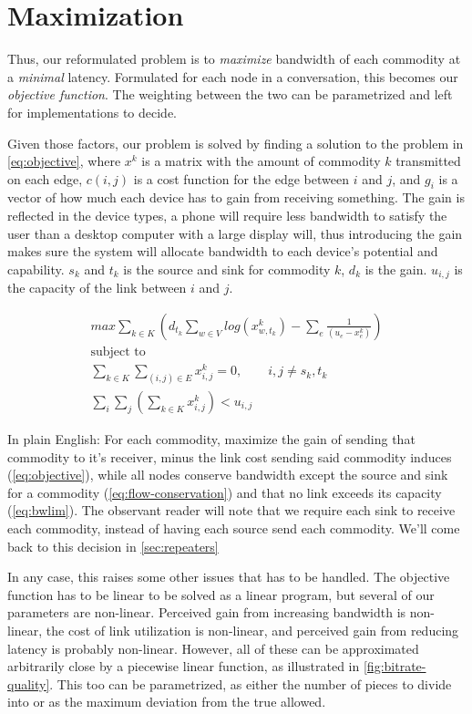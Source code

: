 \section{Maximization}

Thus, our reformulated problem is to \emph{maximize} bandwidth of each commodity at a \emph{minimal} latency. Formulated for each node in a conversation, this becomes our \emph{objective function}. The weighting between the two can be parametrized and left for implementations to decide.

Given those factors, our problem is solved by finding a solution to the problem in \autoref{eq:objective}, where $x^k$ is a matrix with the amount of commodity $k$ transmitted on each edge, $c(i, j)$ is a cost function for the edge between $i$ and $j$, and $g_i$ is a vector of how much each device has to gain from receiving something. The gain is reflected in the device types, a phone will require less bandwidth to satisfy the user than a desktop computer with a large display will, thus introducing the gain makes sure the system will allocate bandwidth to each device's potential and capability. $s_k$ and $t_k$ is the source and sink for commodity $k$, $d_k$ is the gain. $u_{i, j}$ is the capacity of the link between $i$ and $j$.

\begin{gather}\label{eq:objective}
    max \sum_{k \in K} (d_{t_k} \sum_{w \in V} log(x_{w, t_k}^k) - \sum_e \frac{1}{(u_e - x_e^k)})\\
    \text{subject to} \nonumber \\
    \sum_{k \in K} \sum_{(i, j) \in E} x_{i, j}^k = 0, \qquad{} i, j \neq s_k, t_k \label{eq:flow-conservation} \\
    \sum_i \sum_j (\sum_{k \in K}x_{i, j}^k) < u_{i, j} \label{eq:bwlim}
\end{gather}


In plain English: For each commodity, maximize the gain of sending that commodity to it's receiver, minus the link cost sending said commodity induces (\autoref{eq:objective}), while all nodes conserve bandwidth except the source and sink for a commodity (\autoref{eq:flow-conservation}) and that no link exceeds its capacity (\autoref{eq:bwlim}). The observant reader will note that we require each sink to receive each commodity, instead of having each source send each commodity. We'll come back to this decision in \autoref{sec:repeaters}

In any case, this raises some other issues that has to be handled. The objective function has to be linear to be solved as a linear program, but several of our parameters are non-linear. Perceived gain from increasing bandwidth is non-linear, the cost of link utilization is non-linear, and perceived gain from reducing latency is probably non-linear. However, all of these can be approximated arbitrarily close by a piecewise linear function, as illustrated in \autoref{fig:bitrate-quality}. This too can be parametrized, as either the number of pieces to divide into or as the maximum deviation from the true allowed.

